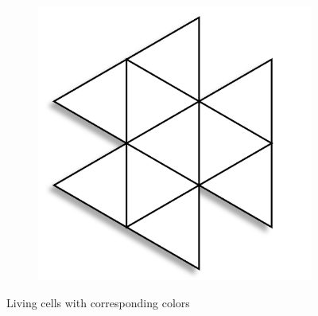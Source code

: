 \documentclass{article}
\begin{document}
\begin{figure}[H]
\begin{subfigure}[b]{0.1\textwidth}
    \end{subfigure}
    \begin{subfigure}[b]{0.1\textwidth}
        \centering
        \includegraphics[width=.9\textwidth]{graphics/behavior/center-columns/white.png}
    \end{subfigure}
       \caption{Living cells with corresponding colors}
       \label{fig:colors}
\end{figure}

\vspace{-4pt}
\end{document}
